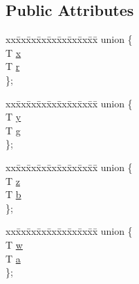 \subsection*{Public Attributes}
\begin{DoxyCompactItemize}
\item 
\begin{tabbing}
xx\=xx\=xx\=xx\=xx\=xx\=xx\=xx\=xx\=\kill
union \{\\
\>T \mbox{\hyperlink{structpad_1_1math_1_1_vector4_a977619c0dbd2e7060bb1f839d3fa8337}{x}}\\
\>T \mbox{\hyperlink{structpad_1_1math_1_1_vector4_a2288e82eaf6dd6c283f4714503b13096}{r}}\\
\}; \\

\end{tabbing}\item 
\begin{tabbing}
xx\=xx\=xx\=xx\=xx\=xx\=xx\=xx\=xx\=\kill
union \{\\
\>T \mbox{\hyperlink{structpad_1_1math_1_1_vector4_a2461711530968b1c7c5ff1256a5a6098}{y}}\\
\>T \mbox{\hyperlink{structpad_1_1math_1_1_vector4_ac4a05c791e0522930bed20045239e870}{g}}\\
\}; \\

\end{tabbing}\item 
\begin{tabbing}
xx\=xx\=xx\=xx\=xx\=xx\=xx\=xx\=xx\=\kill
union \{\\
\>T \mbox{\hyperlink{structpad_1_1math_1_1_vector4_a9407faaccb5b094aeb3cadc36e71755e}{z}}\\
\>T \mbox{\hyperlink{structpad_1_1math_1_1_vector4_a00d2630fa1befcfa4c343e2f4187ec71}{b}}\\
\}; \\

\end{tabbing}\item 
\begin{tabbing}
xx\=xx\=xx\=xx\=xx\=xx\=xx\=xx\=xx\=\kill
union \{\\
\>T \mbox{\hyperlink{structpad_1_1math_1_1_vector4_abbbd617d5083a886936724282216bee4}{w}}\\
\>T \mbox{\hyperlink{structpad_1_1math_1_1_vector4_afb5d50917f750bbe417871b7f290b10c}{a}}\\
\}; \\

\end{tabbing}\end{DoxyCompactItemize}


